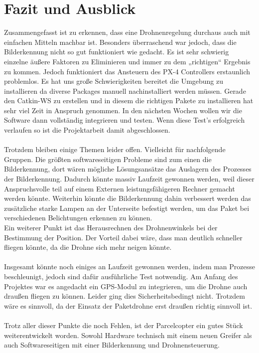 \chapter{Fazit und Ausblick}
\label{fazit}
Zusammengefasst ist zu erkennen, dass eine Drohnenregelung durchaus auch mit einfachen Mitteln machbar ist. Besonders überraschend war jedoch, dass die Bilderkennung nicht so gut funktioniert wie gedacht. Es ist sehr schwierig einzelne äußere Faktoren zu Eliminieren und immer zu dem „richtigen“ Ergebnis zu kommen. Jedoch funktioniert das Ansteuern des PX-4 Controllers erstaunlich problemlos. Es hat uns große Schwierigkeiten bereitet die Umgebung zu installieren da diverse Packages manuell nachinstalliert werden müssen. Gerade den Catkin-WS zu erstellen und in diesem die richtigen Pakete zu installieren hat sehr viel Zeit in Anspruch genommen.
In den nächsten Wochen wollen wir die Software dann vollständig integrieren und testen. Wenn diese Test's erfolgreich verlaufen so ist die Projektarbeit damit abgeschlossen.\\
\\
Trotzdem bleiben einige Themen leider offen. Vielleicht für nachfolgende Gruppen.
Die größten softwareseitigen Probleme sind zum einen die Bilderkennung, dort wären mögliche Lösungsansätze das Auslagern des Prozesses der Bilderkennung. Dadurch könnte massiv Laufzeit gewonnen werden, weil dieser Anspruchsvolle teil auf einem Externen leistungsfähigeren Rechner gemacht werden könnte. 
Weiterhin könnte die Bilderkennung dahin verbessert werden das zusätzliche starke Lampen an der Unterseite befestigt werden, um das Paket bei verschiedenen Belichtungen erkennen zu können.\\
Ein weiterer Punkt ist das Herausrechnen des Drohnenwinkels bei der Bestimmung der Position. Der Vorteil dabei wäre, dass man deutlich schneller fliegen könnte, da die Drohne sich mehr neigen könnte.\\
\\
Insgesamt könnte noch einiges an Laufzeit gewonnen werden, indem man Prozesse beschleunigt, jedoch sind dafür ausführliche Test notwendig.
Am Anfang des Projektes war es angedacht ein GPS-Modul zu integrieren, um die Drohne auch draußen fliegen zu können. Leider ging dies Sicherheitsbedingt nicht. Trotzdem wäre es sinnvoll, da der Einsatz der Paketdrohne erst draußen richtig sinnvoll ist.\\
\\
Trotz aller dieser Punkte die noch Fehlen, ist der Parcelcopter ein gutes Stück weiterentwickelt worden. Sowohl Hardware technisch mit einem neuen Greifer als auch Softwareseitigen mit einer Bilderkennung und Drohnensteuerung.\\
\\
